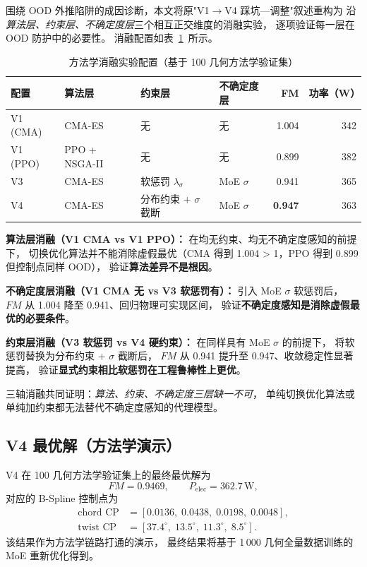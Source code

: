 围绕 OOD 外推陷阱的成因诊断，本文将原"V1$\to$V4 踩坑—调整"叙述重构为
沿\emph{算法层、约束层、不确定度层}三个相互正交维度的消融实验，
逐项验证每一层在 OOD 防护中的必要性。
消融配置如表~\ref{tab:v1v4_full}~所示。

\begin{table}[htbp]
\centering
\caption{方法学消融实验配置（基于 100 几何方法学验证集）}
\label{tab:v1v4_full}
\begin{tabular}{llllrr}
\toprule
\textbf{配置} & \textbf{算法层} & \textbf{约束层} & \textbf{不确定度层} & \textbf{FM} & \textbf{功率（W）} \\
\midrule
V1 (CMA) & CMA-ES & 无 & 无 & 1.004 & 342 \\
V1 (PPO) & PPO + NSGA-II & 无 & 无 & 0.899 & 382 \\
V3       & CMA-ES & 软惩罚 $\lambda_\sigma$ & MoE $\sigma$ & 0.941 & 365 \\
V4       & CMA-ES & 分布约束 + $\sigma$ 截断 & MoE $\sigma$ & \textbf{0.947} & 363 \\
\bottomrule
\end{tabular}
\end{table}

\textbf{算法层消融（V1 CMA vs V1 PPO）：}
在均无约束、均无不确定度感知的前提下，
切换优化算法并不能消除虚假最优（CMA 得到 1.004 > 1，PPO 得到 0.899 但控制点同样 OOD），
验证\textbf{算法差异不是根因}。

\textbf{不确定度层消融（V1 CMA 无 vs V3 软惩罚有）：}
引入 MoE $\sigma$ 软惩罚后，
$FM$ 从 1.004 降至 0.941、回归物理可实现区间，
验证\textbf{不确定度感知是消除虚假最优的必要条件}。

\textbf{约束层消融（V3 软惩罚 vs V4 硬约束）：}
在同样具有 MoE $\sigma$ 的前提下，
将软惩罚替换为分布约束 + $\sigma$ 截断后，
$FM$ 从 0.941 提升至 0.947、收敛稳定性显著提高，
验证\textbf{显式约束相比软惩罚在工程鲁棒性上更优}。

三轴消融共同证明：\emph{算法、约束、不确定度三层缺一不可}，
单纯切换优化算法或单纯加约束都无法替代不确定度感知的代理模型。

\subsection{V4 最优解（方法学演示）}

V4 在 100 几何方法学验证集上的最终最优解为
\begin{equation*}
FM = 0.9469, \qquad P_{\text{elec}} = 362.7\,\text{W},
\end{equation*}
对应的 B-Spline 控制点为
\begin{align*}
\text{chord CP} &= [0.0136,\;0.0438,\;0.0198,\;0.0048], \\
\text{twist CP} &= [37.4^\circ,\;13.5^\circ,\;11.3^\circ,\;8.5^\circ].
\end{align*}
该结果作为方法学链路打通的演示，
最终结果将基于 1\,000 几何全量数据训练的 MoE 重新优化得到。

